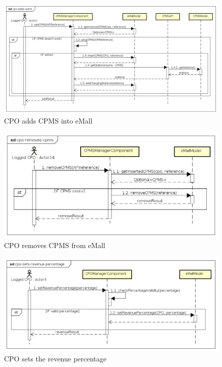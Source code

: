 \begin{figure}[!h]
    \begin{center}
        \includegraphics[keepaspectratio, width=16cm]{Sequence/cpo-adds-cpms.png}
        \caption{\ac{CPO} adds \ac{CPMS} into \ac{eMall}}
        \label{fig:cpo-adds-cpms}
    \end{center}
\end{figure}
\begin{figure}[!h]
    \begin{center}
        \includegraphics[keepaspectratio, width=16cm]{Sequence/cpo-removes-cpms.png}
        \caption{\ac{CPO} removes \ac{CPMS} from \ac{eMall}}
        \label{fig:cpo-removes-cpms}
    \end{center}
\end{figure}
\begin{figure}[!h]
    \begin{center}
        \includegraphics[keepaspectratio, width=16cm]{Sequence/cpo-sets-revenue-percentage.png}
        \caption{\ac{CPO} sets the revenue percentage}
        \label{fig:cpo-sets-revenue-percentage}
    \end{center}
\end{figure}
